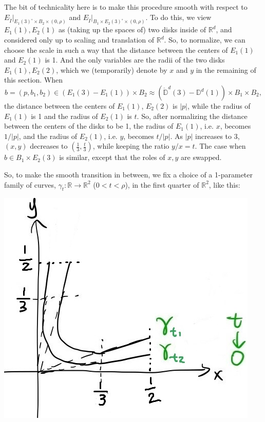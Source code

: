 \documentclass[11pt]{article}
\theoremstyle{definition}
\theoremstyle{remark}
\def\mr#1{{\mathring{#1}}}
\def\R{\mathbb{R}}
\def\D{\mathbb{D}}
\def\rI{{\mathring{I}}}
\begin{document}
The bit of technicality here is to make this procedure smooth with respect to $E_\rI|_{E_1(3)^\circ\times B_2\times(0,\rho)}$ and $E_\rI|_{B_1\times E_2(3)^\circ\times(0,\rho)}$. 
To do this, we view $E_1(1),E_2(1)$ as (taking up the spaces of) two disks inside of $\R^d$, and considered only up to scaling and translation of $\R^d$. 
So, to normalize, we can choose the scale in such a way that the distance between the centers of $E_1(1)$ and $E_2(1)$ is 1. And the only variables are the radii of the two disks $E_1(1), E_2(2)$, which we (temporarily) denote by $x$ and $y$ in the remaining of this section. 
When 
$$b=(p,b_1,b_2)\in (E_1(3)-E_1(1))\times B_2\approx(\mr\D^d(3)-\D^d(1))\times B_1\times B_2,$$
the distance between the centers of $E_1(1)$, $E_2(2)$ is $|p|$, while the radius of $E_1(1)$ is 1 and the radius of $E_2(1)$ is $t$. 
So, after normalizing the distance between the centers of the disks to be 1, the radius of $E_1(1)$, i.e. $x$, becomes $1/|p|$, and the radius of $E_2(1)$, i.e. $y$, becomes $t/|p|$. 
As $|p|$ increases to 3, $(x,y)$ decreases to $(\frac{1}{3},\frac{t}{3})$, while keeping the ratio $y/x=t$. 
The case when $b\in B_1\times E_2(3)$ is similar, except that the roles of $x,y$ are swapped. 

So, to make the smooth transition in between, we fix a choice of a 1-parameter family of curves, $\gamma_t:\R\to\R^2$ ($0<t<\rho$), in the first quarter of $\R^2$, like this: 

\includegraphics[scale=0.3]{gamma_t.jpg}
\end{document}
